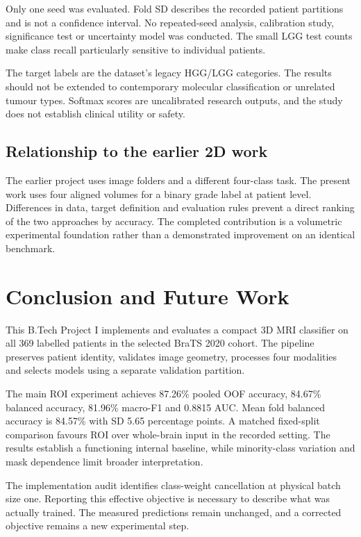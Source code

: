 \documentclass[12pt,a4paper,oneside]{report}
\begin{document}
Only one seed was evaluated. Fold SD describes the recorded patient partitions and is not a confidence interval. No repeated-seed analysis, calibration study, significance test or uncertainty model was conducted. The small LGG test counts make class recall particularly sensitive to individual patients.

The target labels are the dataset's legacy HGG/LGG categories. The results should not be extended to contemporary molecular classification or unrelated tumour types. Softmax scores are uncalibrated research outputs, and the study does not establish clinical utility or safety.

\section{Relationship to the earlier 2D work}
The earlier project uses image folders and a different four-class task. The present work uses four aligned volumes for a binary grade label at patient level. Differences in data, target definition and evaluation rules prevent a direct ranking of the two approaches by accuracy. The completed contribution is a volumetric experimental foundation rather than a demonstrated improvement on an identical benchmark.

\chapter{Conclusion and Future Work}
\label{ch:conclusion}
This B.Tech Project I implements and evaluates a compact 3D MRI classifier on all 369 labelled patients in the selected BraTS 2020 cohort. The pipeline preserves patient identity, validates image geometry, processes four modalities and selects models using a separate validation partition.

The main ROI experiment achieves 87.26\% pooled OOF accuracy, 84.67\% balanced accuracy, 81.96\% macro-F1 and 0.8815 AUC. Mean fold balanced accuracy is 84.57\% with SD 5.65 percentage points. A matched fixed-split comparison favours ROI over whole-brain input in the recorded setting. The results establish a functioning internal baseline, while minority-class variation and mask dependence limit broader interpretation.

The implementation audit identifies class-weight cancellation at physical batch size one. Reporting this effective objective is necessary to describe what was actually trained. The measured predictions remain unchanged, and a corrected objective remains a new experimental step.
\end{document}
